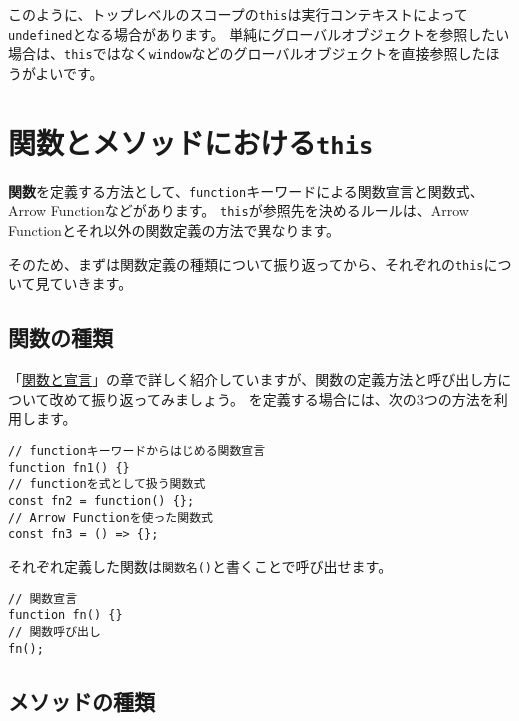 このように、トップレベルのスコープの\texttt{this}は実行コンテキストによって\texttt{undefined}となる場合があります。
単純にグローバルオブジェクトを参照したい場合は、\texttt{this}ではなく\texttt{window}などのグローバルオブジェクトを直接参照したほうがよいです。

\hypertarget{function-and-method-this}{%
\section{\texorpdfstring{関数とメソッドにおける\texttt{this}}{関数とメソッドにおけるthis}}\label{function-and-method-this}}

\textbf{関数}を定義する方法として、\texttt{function}キーワードによる関数宣言と関数式、Arrow
Functionなどがあります。
\texttt{this}が参照先を決めるルールは、Arrow
Functionとそれ以外の関数定義の方法で異なります。

そのため、まずは関数定義の種類について振り返ってから、それぞれの\texttt{this}について見ていきます。

\hypertarget{type-of-function}{%
\subsection{関数の種類}\label{type-of-function}}

「\hyperlink{function-and-declaration}{関数と宣言}」の章で詳しく紹介していますが、関数の定義方法と呼び出し方について改めて振り返ってみましょう。
\textbf{}を定義する場合には、次の3つの方法を利用します。

\begin{lstlisting}
// functionキーワードからはじめる関数宣言
function fn1() {}
// functionを式として扱う関数式
const fn2 = function() {};
// Arrow Functionを使った関数式
const fn3 = () => {};
\end{lstlisting}

それぞれ定義した関数は\texttt{関数名()}と書くことで呼び出せます。

\begin{lstlisting}
// 関数宣言
function fn() {}
// 関数呼び出し
fn();
\end{lstlisting}

\hypertarget{type-of-method}{%
\subsection{メソッドの種類}\label{type-of-method}}

